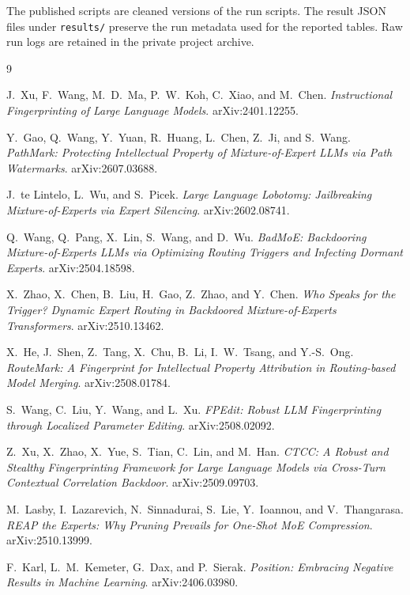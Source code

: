 \documentclass[
  11pt,
  a4paper,
]{article}
\begin{document}
The published scripts are cleaned versions of the run scripts. The
result JSON files under \texttt{results/} preserve the run metadata used
for the reported tables. Raw run logs are retained in the private
project archive.

\begin{thebibliography}{9}

J.~Xu, F.~Wang, M.~D.~Ma, P.~W.~Koh, C.~Xiao, and M.~Chen.
\emph{Instructional Fingerprinting of Large Language Models}.
arXiv:2401.12255.

Y.~Gao, Q.~Wang, Y.~Yuan, R.~Huang, L.~Chen, Z.~Ji, and S.~Wang.
\emph{PathMark: Protecting Intellectual Property of Mixture-of-Expert LLMs via Path Watermarks}.
arXiv:2607.03688.

J.~te Lintelo, L.~Wu, and S.~Picek.
\emph{Large Language Lobotomy: Jailbreaking Mixture-of-Experts via Expert Silencing}.
arXiv:2602.08741.

Q.~Wang, Q.~Pang, X.~Lin, S.~Wang, and D.~Wu.
\emph{BadMoE: Backdooring Mixture-of-Experts LLMs via Optimizing Routing Triggers and Infecting Dormant Experts}.
arXiv:2504.18598.

X.~Zhao, X.~Chen, B.~Liu, H.~Gao, Z.~Zhao, and Y.~Chen.
\emph{Who Speaks for the Trigger? Dynamic Expert Routing in Backdoored Mixture-of-Experts Transformers}.
arXiv:2510.13462.

X.~He, J.~Shen, Z.~Tang, X.~Chu, B.~Li, I.~W.~Tsang, and Y.-S.~Ong.
\emph{RouteMark: A Fingerprint for Intellectual Property Attribution in Routing-based Model Merging}.
arXiv:2508.01784.

S.~Wang, C.~Liu, Y.~Wang, and L.~Xu.
\emph{FPEdit: Robust LLM Fingerprinting through Localized Parameter Editing}.
arXiv:2508.02092.

Z.~Xu, X.~Zhao, X.~Yue, S.~Tian, C.~Lin, and M.~Han.
\emph{CTCC: A Robust and Stealthy Fingerprinting Framework for Large Language Models via Cross-Turn Contextual Correlation Backdoor}.
arXiv:2509.09703.

M.~Lasby, I.~Lazarevich, N.~Sinnadurai, S.~Lie, Y.~Ioannou, and V.~Thangarasa.
\emph{REAP the Experts: Why Pruning Prevails for One-Shot MoE Compression}.
arXiv:2510.13999.

F.~Karl, L.~M.~Kemeter, G.~Dax, and P.~Sierak.
\emph{Position: Embracing Negative Results in Machine Learning}.
arXiv:2406.03980.

\end{thebibliography}
\end{document}
